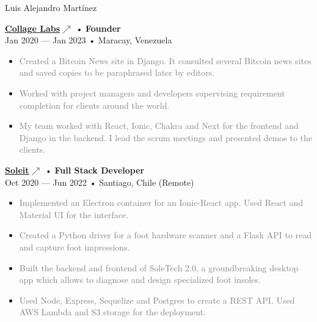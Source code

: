 \documentclass[12pt]{article}
\begin{document}
\begin{cv}{Luis Alejandro Mart\'inez}
\begin{minipage}[t]{0.55\textwidth}
{{\begin{itemize}
        \end{itemize}
      }
    }\vspace{0.125em}
    \parbox[t]{\linewidth}{
      \textbf{\href{https://collagelabs.org}{Collage Labs\footnotesize{$\nearrow$}}} • \textrm{\textbf{Founder}}\\
      Jan 2020 --- Jan 2023 • Maracay, Venezuela\\
      \footnotesize{
        \vspace{-\topsep}
        \vspace{-\topsep}
        \begin{itemize}
          \setlength{\parskip}{0pt}
          \setlength{\itemsep}{0pt}
          \item \textcolor{gray}{Created a Bitcoin News site in Django. It consulted several Bitcoin news sites and saved copies to be paraphrased later by editors.}
          \item \textcolor{gray}{Worked with project managers and developers supervising requirement completion for clients around the world.}
          \item \textcolor{gray}{My team worked with React, Ionic, Chakra and Next for the frontend and Django in the backend. I lead the scrum meetings and presented demos to the clients.}
        \end{itemize}
      }
    }\vspace{0.125em}
    \parbox[t]{\linewidth}{
      \textbf{\href{https://soleit.app}{Soleit\footnotesize{$\nearrow$}}} • \textrm{\textbf{Full Stack Developer}}\\
      Oct 2020 --- Jun 2022 • Santiago, Chile (Remote)\\
      \footnotesize{
        \vspace{-\topsep}
        \vspace{-\topsep}
        \begin{itemize}
          \setlength{\parskip}{0pt}
          \setlength{\itemsep}{0pt}
          \item \textcolor{gray}{Implemented an Electron container for an Ionic-React app. Used React and Material UI for the interface.}
          \item \textcolor{gray}{Created a Python driver for a foot hardware scanner and a Flask API to read and capture foot impressions.}
          \item \textcolor{gray}{Built the backend and frontend of SoleTech 2.0, a groundbreaking desktop app which allows to diagnose and design specialized foot insoles.}
          \item \textcolor{gray}{Used Node, Express, Sequelize and Postgres to create a REST API. Used AWS Lambda and S3 storage for the deployment.}

\end{itemize}}}
\end{minipage}
\end{cv}
\end{document}
